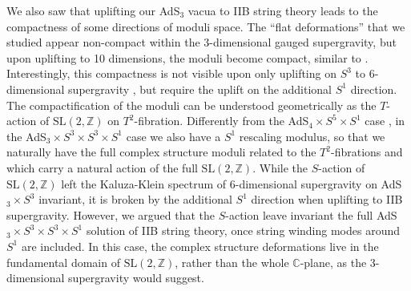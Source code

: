 \documentclass[a4paper, 11pt]{article}
\numberwithin{equation}{section}
\newcommand{\SL}[1]{\mathrm{SL}( #1 )}
\newcommand{\+}{\oplus}
\begin{document}
We also saw that uplifting our AdS$_3$ vacua to IIB string theory leads to the compactness of some directions of moduli space. The ``flat deformations'' that we studied appear non-compact within the 3-dimensional gauged supergravity, but upon uplifting to 10 dimensions, the moduli become compact, similar to \cite{Giambrone:2021zvp,Giambrone:2021wsm}. Interestingly, this compactness is not visible upon only uplifting on $S^3$ to 6-dimensional supergravity \cite{Eloy:2021fhc}, but require the uplift on the additional $S^1$ direction. The compactification of the moduli can be understood geometrically as the $T$-action of $\SL{2,\mathbb{Z}}$ on $T^2$-fibration. Differently from the AdS$_4 \times S^5 \times S^1$ case \cite{Guarino:2020gfe,Guarino:2021hrc,Giambrone:2021zvp,Giambrone:2021wsm}, in the AdS$_3 \times S^3 \times S^3 \times S^1$ case we also have a $S^1$ rescaling modulus, so that we naturally have the full complex structure moduli related to the $T^2$-fibrations and which carry a natural action of the full $\SL{2,\mathbb{Z}}$. While the $S$-action of $\SL{2,\mathbb{Z}}$ left the Kaluza-Klein spectrum of 6-dimensional supergravity on AdS$_3 \times S^3$ \cite{Eloy:2021fhc} invariant, it is broken by the additional $S^1$ direction when uplifting to IIB supergravity. However, we argued that the $S$-action leave invariant the full AdS$_3 \times S^3 \times S^3 \times S^1$ solution of IIB string theory, once string winding modes around $S^1$ are included. In this case, the complex structure deformations live in the fundamental domain of $\SL{2,\mathbb{Z}}$, rather than the whole $\mathbb{C}$-plane, as the 3-dimensional supergravity would suggest. 
\end{document}
